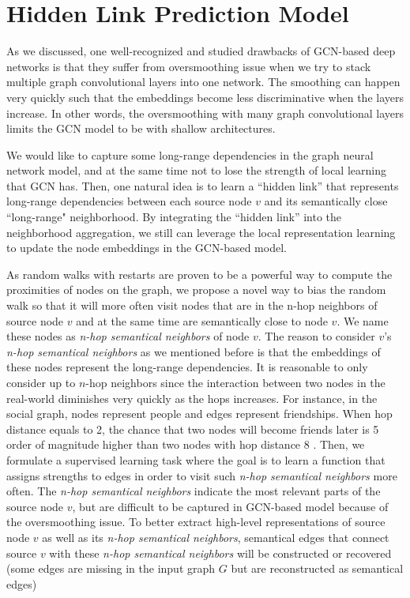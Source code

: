 \vspace{-1ex}
\section{Hidden Link Prediction Model}
\label{sec-srw}
As we discussed, one well-recognized and studied drawbacks of GCN-based deep networks is that they suffer from oversmoothing issue when we try to stack multiple graph convolutional layers into one network. The smoothing can happen very quickly such that the embeddings become less discriminative when the layers increase. In other words, the oversmoothing with many graph convolutional layers limits the GCN model to be with shallow architectures.

We would like to capture some long-range dependencies in the graph neural network model, and at the same time not to lose the strength of local learning that GCN has. Then, one natural idea is to learn a ``hidden link'' that represents long-range dependencies between each source node $v$ and its semantically close ``long-range" neighborhood. By integrating the ``hidden link'' into the neighborhood aggregation, we still can leverage the local representation learning to update the node embeddings in the GCN-based model. 

As random walks with restarts are proven to be a powerful way to compute the proximities of nodes on the graph, we propose a novel way to bias the random walk so that it will more often visit nodes that are in the n-hop neighbors of source node $v$ and at the same time are semantically close to node $v$. We name these nodes as {\em n-hop semantical neighbors} of node $v$.
The reason to consider $v$'s {\em n-hop semantical neighbors} as we mentioned before is that the embeddings of these nodes represent the long-range dependencies. It is reasonable to only consider up to $n$-hop neighbors since the interaction between two nodes in the real-world diminishes very quickly as the hops increases. For instance, in the social graph, nodes represent people and edges represent friendships. When hop distance equals to 2, the chance that two nodes will become friends later is 5 order of magnitude higher than two nodes with hop distance 8 \cite{backstrom2011supervised}.  Then, we formulate a supervised learning task where the goal is to learn a function that assigns strengths to edges in order to visit such {\em n-hop semantical neighbors} more often. The {\em n-hop semantical neighbors} indicate the most relevant parts of the source node $v$, but are difficult to be captured in GCN-based model because of the oversmoothing issue. To better extract high-level representations of source node $v$ as well as its {\em n-hop semantical neighbors}, semantical edges that connect source $v$ with these {\em n-hop semantical neighbors} will be constructed or recovered (some edges are missing in the input graph $G$ but are reconstructed as semantical edges)

